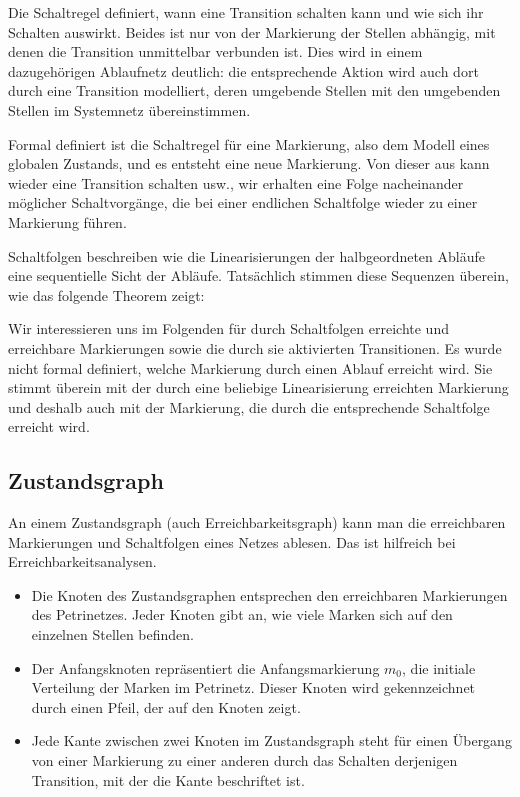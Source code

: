 Die Schaltregel definiert, 
wann eine Transition schalten kann und wie sich ihr Schalten auswirkt. Beides ist nur von der Markierung der Stellen abhängig, mit denen die Transition unmittelbar verbunden ist. Dies wird in einem dazugehörigen \mbox{Ablaufnetz} deutlich: die entsprechende Aktion wird auch dort durch eine Transition modelliert, deren umgebende Stellen mit den umgebenden Stellen im Systemnetz übereinstimmen.

Formal definiert ist die Schaltregel für eine Markierung, also dem Modell eines globalen Zustands, und es entsteht eine neue Markierung. Von dieser aus kann wieder eine Transition schalten usw., wir erhalten eine Folge nacheinander möglicher Schaltvorgänge, die bei einer endlichen Schaltfolge wieder zu einer Markierung führen.

Schaltfolgen 
beschreiben wie die Linearisierungen der halbgeordneten Abläufe eine sequentielle Sicht der Abläufe. Tatsächlich stimmen diese Sequenzen überein, wie das folgende Theorem zeigt:


Wir interessieren uns im Folgenden für durch Schaltfolgen erreichte und erreichbare Markierungen sowie die durch sie aktivierten Transitionen. Es wurde nicht formal definiert, welche Markierung durch einen Ablauf erreicht wird. Sie stimmt überein mit der durch eine beliebige Linearisierung erreichten Markierung und deshalb auch mit der Markierung, die durch die entsprechende Schaltfolge erreicht wird.

\subsection*{Zustandsgraph}

An einem Zustandsgraph (auch Erreichbarkeitsgraph) kann man die erreichbaren Markierungen und Schaltfolgen eines Netzes ablesen. Das ist hilfreich bei Erreichbarkeitsanalysen.


\begin{itemize}
	\item Die Knoten des Zustandsgraphen entsprechen den erreichbaren Markierungen des Petrinetzes. Jeder Knoten gibt an, wie viele Marken sich auf den einzelnen Stellen befinden.
	\item Der Anfangsknoten repräsentiert die Anfangsmarkierung $m_0$, die initiale Verteilung der Marken im Petrinetz. Dieser Knoten wird gekennzeichnet durch einen Pfeil, der auf den Knoten zeigt.
	\item Jede Kante zwischen zwei Knoten im Zustandsgraph steht für einen Übergang von einer Markierung zu einer anderen durch das Schalten derjenigen Transition, mit der die Kante beschriftet ist.
\end{itemize}

